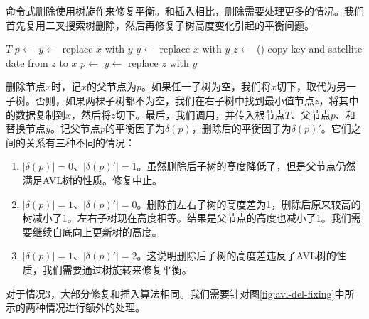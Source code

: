 \documentclass[b5paper]{ctexart}
\begin{document}
命令式删除使用树旋作来修复平衡。和插入相比，删除需要处理更多的情况。我们首先复用二叉搜索树删除，然后再修复子树高度变化引起的平衡问题。

\begin{algorithmic}[1]
    \State \Return $T$
  \EndIf
  \State $p \gets$ 
    \State $y \gets $ 
    \State replace $x$ with $y$
    \State $y \gets $ 
    \State replace $x$ with $y$
  \Else
    \State $z \gets$ ()
    \State copy key and satellite date from $z$ to $x$
    \State $p \gets$ 
    \State $y \gets$ 
    \State replace $z$ with $y$
  \EndIf
  \State \Return {}
\EndFunction
\end{algorithmic}

删除节点$x$时，记$x$的父节点为$p$。如果任一子树为空，我们将$x$切下，取代为另一子树。否则，如果两棵子树都不为空，我们在右子树中找到最小值节点$z$，将其中的数据复制到$x$，然后将$z$切下。最后，我们调用，并传入根节点$T$、父节点$p$、和替换节点$y$。记父节点$p$的平衡因子为$\delta(p)$，删除后的平衡因子为$\delta(p)'$。它们之间的关系有三种不同的情况：

\begin{enumerate}
\item $|\delta(p)| = 0$、$|\delta(p)'| = 1$。虽然删除后子树的高度降低了，但是父节点仍然满足AVL树的性质。修复中止。

\item $|\delta(p)| = 1$、$|\delta(p)'| = 0$。删除前左右子树的高度差为1，删除后原来较高的树减小了1。左右子树现在高度相等。结果是父节点的高度也减小了1。我们需要继续自底向上更新树的高度。

\item $|\delta(p)| = 1$、$|\delta(p)'| = 2$。这说明删除后子树的高度差违反了AVL树的性质，我们需要通过树旋转来修复平衡。
\end{enumerate}

对于情况3，大部分修复和插入算法相同。我们需要针对图\ref{fig:avl-del-fixing}中所示的两种情况进行额外的处理。
\end{document}

